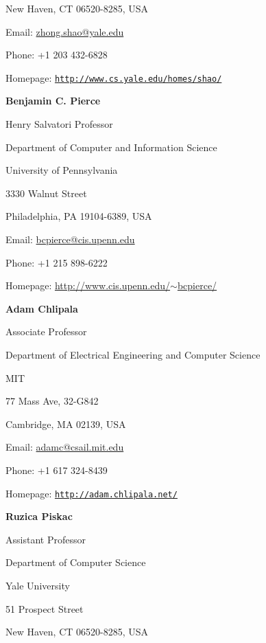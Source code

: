 \documentclass[11pt]{article}
\providecommand*\url[1]{\href{#1}{#1}}
\renewcommand*\url[1]{\href{#1}{\texttt{#1}}}
\providecommand*\email[1]{\href{mailto:#1}{#1}}
\begin{document}
New Haven, CT 06520-8285, USA

\vspace{.05in}
Email: \email{zhong.shao@yale.edu}

Phone:  +1 203 432-6828

Homepage: \url{http://www.cs.yale.edu/homes/shao/}

\vspace{.2in}

\textbf{Benjamin C. Pierce} 

Henry Salvatori Professor

Department of Computer and Information Science 

University of Pennsylvania

3330 Walnut Street

Philadelphia, PA  19104-6389, USA
\vspace{.05in}

Email: \email{bcpierce@cis.upenn.edu}

Phone: +1 215 898-6222

Homepage: \href{http://www.cis.upenn.edu/~bcpierce/}{http://www.cis.upenn.edu/$\sim$bcpierce/}

\vspace{.2in}

\textbf{Adam Chlipala}

Associate Professor

Department of Electrical Engineering and Computer Science

MIT

77 Mass Ave, 32-G842

Cambridge, MA   02139, USA

\vspace{.05in}

Email: \email{adamc@csail.mit.edu}

Phone: +1 617 324-8439

Homepage: \url{http://adam.chlipala.net/}

\vspace{.2in}

\textbf{Ruzica Piskac}

Assistant Professor

Department of Computer Science

Yale University

51 Prospect Street

New Haven, CT 06520-8285, USA

\vspace{.05in}
\end{document}
